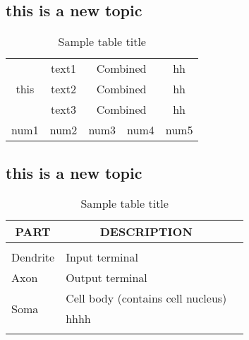 \documentclass{article}
\begin{document}
\subsection{this is a new topic}


\begin{table}[t]

\caption{Sample table title}
\label{sample-table}
\begin{center}
\begin{tabular}{|c|c|c|c|c|} %
\hline
\multirow{3}{*}{this} & text1 & \multicolumn{2}{|c|}{Combined} & hh\\ %
                      & text2 & \multicolumn{2}{|c|}{Combined} & hh\\ %
                      & text3 & \multicolumn{2}{|c|}{Combined} & hh\\ %
\hline
num1 & num2 & num3 & num4 & num5\\ %
\hline
\end{tabular}
\end{center}
\end{table}

\subsection{this is a new topic}
\begin{table}[t]

\caption{Sample table title}
\label{sample-table}
\begin{center}
\begin{tabular}{lll}
\multicolumn{1}{c}{\bf PART}  &\multicolumn{1}{c}{\bf DESCRIPTION}
\\ \hline \\
Dendrite         &Input terminal \\
Axon             &Output terminal \\
\multirow{2}{*}{Soma}             &Cell body (contains cell nucleus) \\
                                &hhhh                              \\
\hline \\
\end{tabular}
\end{center}
\end{table}
\end{document}
